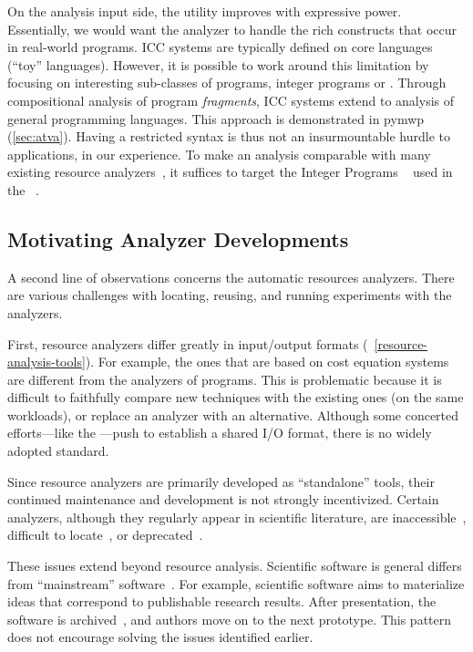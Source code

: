 On the analysis input side, the utility improves with expressive
power. Essentially, we would want the analyzer to handle
the rich constructs that occur in real-world programs. ICC systems are typically
defined on core languages (\enquote{toy} languages). However, it is possible to
work around this limitation by focusing on interesting sub-classes of programs,
\eg integer programs or . Through
compositional analysis of program \emph{fragments}, ICC
systems extend to analysis of general programming languages. This approach is
demonstrated in pymwp (\autoref{sec:atva}). Having a restricted syntax is thus
not an insurmountable hurdle to applications, in our experience. To make an
analysis comparable with many existing resource analyzers~\cite{flores17}, it suffices to target the  Integer Programs
~\cite{cinteger} used in the ~\cite{giesl2019}.

\subsection{Motivating Analyzer Developments}
\label{ssec:analyzer-dev}

A second line of observations concerns the automatic resources analyzers. There
are various challenges with locating, reusing, and running experiments with the
analyzers.

First, resource analyzers differ greatly in input/output formats
(\cf~\autoref{resource-analysis-tools}). For example, the ones that are based on
{cost equation system}s are different from the analyzers of  programs.
This is problematic because it is difficult to faithfully compare new techniques
with the existing ones (on the same workloads), or replace an analyzer with an
alternative. Although some concerted efforts---like the ---push to establish a shared I/O format, there is no widely adopted
standard.

Since resource analyzers are primarily developed as \enquote{standalone} tools,
their continued maintenance and development is not strongly incentivized.
Certain analyzers, although they regularly appear in scientific literature, are
inaccessible~\cite{sinn2017}, difficult to locate~\cite{carbonneaux2015}, or
deprecated~\cite{gulwani2009,srikanth2017}.

These issues extend beyond resource analysis. Scientific software is general
differs from \enquote{mainstream} software~\cite{hannay2009,joppa2013}. For
example, scientific software aims to materialize ideas that correspond to
publishable research results. After presentation, the software is
archived~\cite{acm_badging}, and authors move on to the next prototype. This
pattern does not encourage solving the issues identified earlier.

